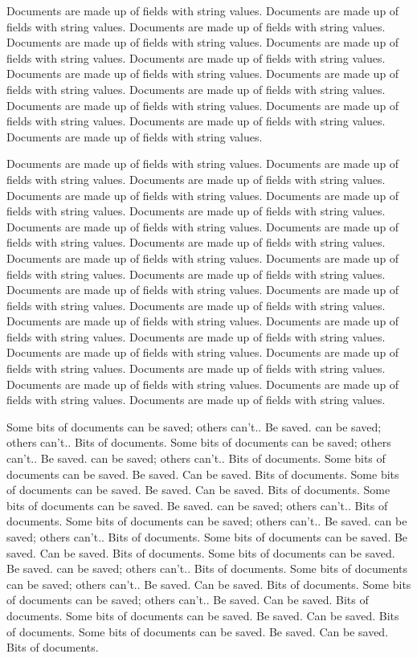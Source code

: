 \documentclass[11pt]{book}
\begin{document}
Documents are made up of fields with string values.
Documents are made up of fields with string values.
Documents are made up of fields with string values.
Documents are made up of fields with string values.
Documents are made up of fields with string values.
Documents are made up of fields with string values.
Documents are made up of fields with string values.
Documents are made up of fields with string values.
Documents are made up of fields with string values.
Documents are made up of fields with string values.
Documents are made up of fields with string values.
Documents are made up of fields with string values.
Documents are made up of fields with string values.


Documents are made up of fields with string values.
Documents are made up of fields with string values.
Documents are made up of fields with string values.
Documents are made up of fields with string values.
Documents are made up of fields with string values.
Documents are made up of fields with string values.
Documents are made up of fields with string values.
Documents are made up of fields with string values.
Documents are made up of fields with string values.
Documents are made up of fields with string values.
Documents are made up of fields with string values.
Documents are made up of fields with string values.
Documents are made up of fields with string values.
Documents are made up of fields with string values.
Documents are made up of fields with string values.
Documents are made up of fields with string values.
Documents are made up of fields with string values.
Documents are made up of fields with string values.
Documents are made up of fields with string values.
Documents are made up of fields with string values.
Documents are made up of fields with string values.
Documents are made up of fields with string values.
Documents are made up of fields with string values.
Documents are made up of fields with string values.

Some bits of documents can be saved; others can't..  Be saved.
can be saved; others can't..  Bits of documents.
Some bits of documents can be saved; others can't..  Be saved.
can be saved; others can't..  Bits of documents.
Some bits of documents can be saved.  Be saved.
Can be saved.  Bits of documents.
Some bits of documents can be saved.  Be saved.
Can be saved.  Bits of documents.
Some bits of documents can be saved.  Be saved.
can be saved; others can't..  Bits of documents.
Some bits of documents can be saved; others can't..  Be saved.
can be saved; others can't..  Bits of documents.
Some bits of documents can be saved.  Be saved.
Can be saved.  Bits of documents.
Some bits of documents can be saved.  Be saved.
can be saved; others can't..  Bits of documents.
Some bits of documents can be saved; others can't..  Be saved.
Can be saved.  Bits of documents.
Some bits of documents can be saved; others can't..  Be saved.
Can be saved.  Bits of documents.
Some bits of documents can be saved.  Be saved.
Can be saved.  Bits of documents.
Some bits of documents can be saved.  Be saved.
Can be saved.  Bits of documents.
\end{document}
